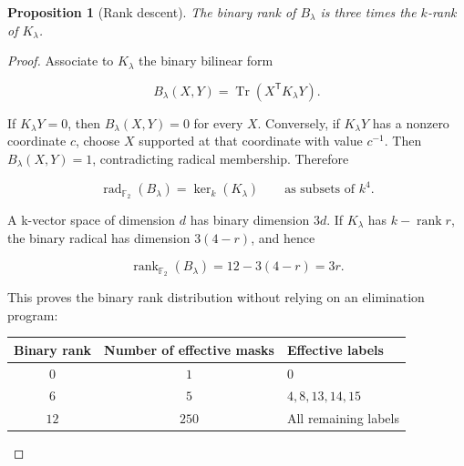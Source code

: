 \documentclass[11pt,a4paper]{article}
\newcommand{\F}{\mathbb F}
\DeclareMathOperator{\Tr}{Tr}
\DeclareMathOperator{\rad}{rad}
\DeclareMathOperator{\rank}{rank}
\newtheorem{proposition}[theorem]{Proposition}
\theoremstyle{definition}
\begin{document}
\begin{proposition}[Rank descent]\label{prop:rank}The binary rank of $B_\lambda$ is three times the $k$-rank of $K_\lambda$.\end{proposition}\begin{proof}

Associate to $K_{\lambda }$ the binary bilinear form


\begin{equation}\label{eq:50}
B_\lambda(X,Y)=\Tr(X^{\mathsf T}K_\lambda Y).
\end{equation}

If $K_{\lambda }Y=0$, then $B_{\lambda }(X,Y)=0$ for every $X$. Conversely, if $K_{\lambda }Y$ has a nonzero coordinate $c$, choose $X$ supported at that coordinate with value $c^{-1}$. Then $B_{\lambda }(X,Y)=1$, contradicting radical membership. Therefore


\begin{equation}\label{eq:52}
\rad_{\F_2}(B_\lambda)=\ker_k(K_\lambda)\qquad\text{as subsets of }k^4.
\end{equation}

A k-vector space of dimension $d$ has binary dimension $3d$. If $K_{\lambda }$ has $k-\operatorname{rank} r$, the binary radical has dimension $3(4-r)$, and hence


\begin{equation}\label{eq:54}
\rank_{\F_2}(B_\lambda)=12-3(4-r)=3r.
\end{equation}

This proves the binary rank distribution without relying on an elimination program:


\begin{center}\small\renewcommand{\arraystretch}{1.2}\begin{tabular}{ccl}\toprule

Binary rank & Number of effective masks & Effective labels \\
\midrule

$0$ & $1$ & $0$ \\

$6$ & $5$ & $4, 8, 13, 14, 15$ \\

$12$ & $250$ & All remaining labels \\

\bottomrule\end{tabular}\end{center}

\end{proof}
\end{document}
